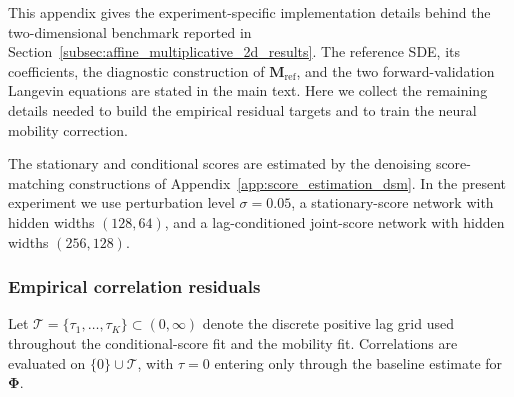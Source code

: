 \documentclass[11pt,twoside,fleqn]{article}
\begin{document}
This appendix gives the experiment-specific implementation details behind the
two-dimensional benchmark reported in
Section~\ref{subsec:affine_multiplicative_2d_results}. The reference SDE,
its coefficients, the diagnostic construction of
\(\bm{M}_{\mathrm{ref}}\), and the two forward-validation Langevin equations are
stated in the main text. Here we collect the remaining details needed to build
the empirical residual targets and to train the neural mobility correction.

The stationary and conditional scores are estimated by the denoising
score-matching constructions of Appendix~\ref{app:score_estimation_dsm}. In
the present experiment we use perturbation level \(\sigma=0.05\), a
stationary-score network with hidden widths \((128,64)\), and a lag-conditioned
joint-score network with hidden widths \((256,128)\).

\subsubsection{Empirical correlation residuals}

Let \(\mathcal{T}=\{\tau_1,\dots,\tau_K\}\subset(0,\infty)\) denote the discrete positive lag grid used throughout the conditional-score fit and the mobility fit. Correlations are evaluated on \(\{0\}\cup\mathcal{T}\), with \(\tau=0\) entering only through the baseline estimate for \(\bm{\Phi}\).
\end{document}
